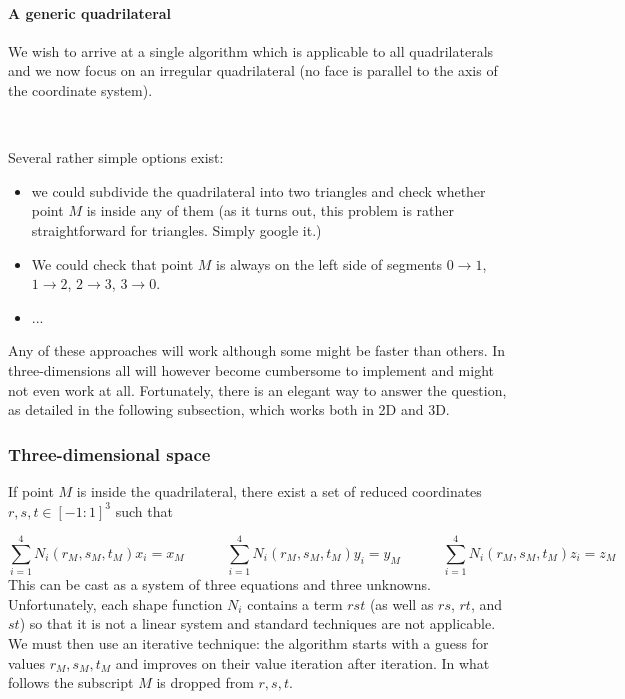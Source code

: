 \paragraph{A generic quadrilateral}

We wish to arrive at a single algorithm which is applicable to all quadrilaterals and we now focus  
on an irregular quadrilateral (no face is parallel to the axis of the coordinate system). 

\begin{center}
\\
\end{center}

Several rather simple options exist:
\begin{itemize}
\item we could subdivide the quadrilateral into two triangles and check whether point $M$ is inside any of them (as it turns out, 
this problem is rather straightforward for triangles. Simply google it.)
\item We could check that point $M$ is always on the left side of segments $0\rightarrow 1$, $1\rightarrow 2$, $2\rightarrow 3$, $3\rightarrow 0$.
\item ...  
\end{itemize}

Any of these approaches will work although some might be faster than others. In three-dimensions all will however become 
cumbersome to implement and might not even work at all. Fortunately, there is an elegant way to answer the question, as 
detailed in the following subsection, which works both in 2D and 3D.

\subsubsection{Three-dimensional space}

If point $M$ is inside the quadrilateral, there exist a set of reduced coordinates $r,s,t\in[-1:1]^3$ such that 

\[
\sum_{i=1}^4 N_i(r_M,s_M,t_M) x_i = x_M
\quad\quad\quad
\sum_{i=1}^4 N_i(r_M,s_M,t_M) y_i = y_M
\quad\quad\quad
\sum_{i=1}^4 N_i(r_M,s_M,t_M) z_i = z_M
\]
This can be cast as a system of three equations and three unknowns. Unfortunately, each shape function $N_i$ 
contains a term $rst$ (as well as $rs$, $rt$, and $st$) so that it is not a linear system and standard techniques
are not applicable. 
We must then use an iterative technique: the algorithm starts with a guess for values $r_M,s_M,t_M$ and 
improves on their value iteration after iteration. In what follows the subscript $M$ is dropped from $r,s,t$.


